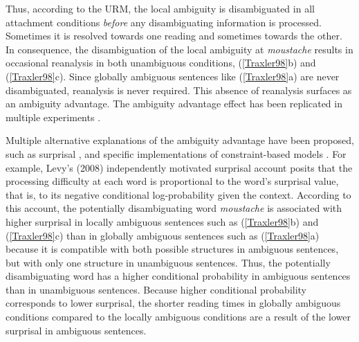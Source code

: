 \documentclass[english, doc]{apa7}\usepackage[]{graphicx}\usepackage[]{color}
\begin{document}
Thus, according to the URM, the local ambiguity is disambiguated in all attachment conditions \textit{before} any disambiguating information is processed. Sometimes it is resolved towards one reading and sometimes towards the other. In consequence, the disambiguation of the local ambiguity at \emph{moustache} results in occasional reanalysis in both unambiguous conditions, (\ref{Traxler98}b) and (\ref{Traxler98}c). Since globally ambiguous sentences like (\ref{Traxler98}a) are never disambiguated, reanalysis is never required. 
This absence of reanalysis surfaces as an ambiguity advantage. The ambiguity advantage effect has been replicated in multiple experiments \citep{vanGompelEtAl:2001, vanGompelEtAl:2005, vonderMalsburgVasishth:2013, DillonEtAl:2019}.

Multiple alternative explanations of the ambiguity advantage have been proposed, such as surprisal \citep{Levy:2008, Hale:2001}, and specific implementations of constraint-based models \citep{GreenMitchell:2006, VosseKempen:2009}. For example, Levy's (2008) independently motivated surprisal account posits that the processing difficulty at each word is proportional to the word's surprisal value, that is, to its negative conditional log-probability given the context. According to this account, the potentially disambiguating word \emph{moustache} is associated with higher surprisal in locally ambiguous sentences such as (\ref{Traxler98}b) and (\ref{Traxler98}c) than in globally ambiguous sentences such as (\ref{Traxler98}a) because it is compatible with both possible structures in ambiguous sentences, but with only one structure in unambiguous sentences. Thus, the potentially disambiguating word has a higher conditional probability in ambiguous sentences than in unambiguous sentences. Because higher conditional probability corresponds to lower surprisal, the shorter reading times in globally ambiguous conditions compared to the locally ambiguous conditions are a result of the lower surprisal in ambiguous sentences.
\end{document}
